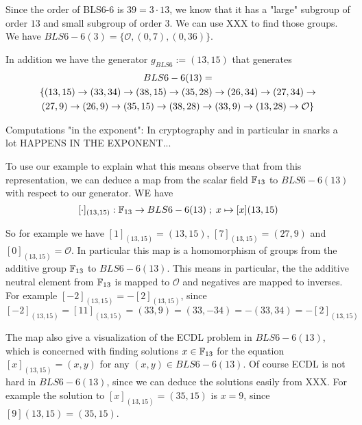 Since the order of BLS6-6 is $39= 3\cdot 13$, we know that it has a "large" subgroup of order $13$ and small subgroup of order $3$. We can use XXX to find those groups. We have $BLS6-6(3)=\{\mathcal{O},(0,7),(0,36)\}$.

In addition we have the generator $g_{BLS6}:=(13,15)$ that generates
\begin{multline}
BLS6-6(13)=\\
\{(13,15) \rightarrow (33,34) \rightarrow  (38,15) \rightarrow  (35,28) \rightarrow (26,34) \rightarrow  (27,34) \rightarrow  \\ 
(27,9)  \rightarrow  (26,9) \rightarrow  (35,15) \rightarrow  (38,28) \rightarrow  (33,9) \rightarrow (13,28) \rightarrow  \mathcal{O}\}$$
\end{multline}

Computations "in the exponent": In cryptography and in particular in snarks a lot HAPPENS IN THE EXPONENT...

To use our example to explain what this means observe that from this representation, we can deduce a map from the scalar field $\mathbb{F}_{13}$ to $BLS6-6(13)$ with respect to our generator. WE have
$$
[\cdot]_{(13,15)}: \mathbb{F}_{13} \to BLS6-6(13)\;;\; x \mapsto [x](13,15)
$$

So for example we have $[1]_{(13,15)}= (13,15)$, $[7]_{(13,15)}= (27,9)$ and $[0]_{(13,15)}= \mathcal{O}$. In particular this map is a homomorphism of groups from the additive group $\mathbb{F}_{13}$ to $BLS6-6(13)$. This means in particular, the the additive neutral element from $\mathbb{F}_{13}$ is mapped to $\mathcal{O}$ and negatives are mapped to inverses. For example $[-2]_{(13,15)}= - [2]_{(13,15)}$, since
$[-2]_{(13,15)}= [11]_{(13,15)}= (33,9) = (33,-34) = -(33,34)=
- [2]_{(13,15)}$

The map also give a visualization of the ECDL problem in $BLS6-6(13)$, which is concerned with finding solutions $x\in \mathbb{F}_{13}$ for the equation 
$[x]_{(13,15)}= (x,y)$ for any $(x,y) \in BLS6-6(13)$. Of course ECDL is not hard in $BLS6-6(13)$, since we can deduce the solutions easily from XXX. For example the solution to $[x]_{(13,15)}= (35,15)$ is $x=9$, since $[9](13,15)=(35,15)$.

